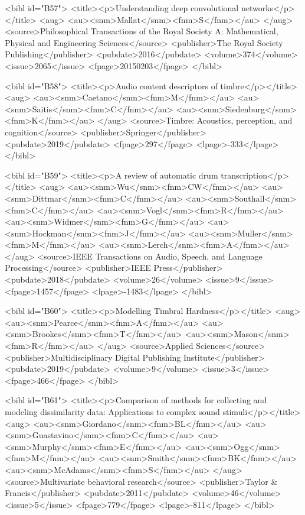 \documentclass{bmcart}
\begin{document}
\begin{backmatter}
{<bibl id="B57">
  <title><p>Understanding deep convolutional networks</p></title>
  <aug>
    <au><snm>Mallat</snm><fnm>S</fnm></au>
  </aug>
  <source>Philosophical Transactions of the Royal Society A: Mathematical,
  Physical and Engineering Sciences</source>
  <publisher>The Royal Society Publishing</publisher>
  <pubdate>2016</pubdate>
  <volume>374</volume>
  <issue>2065</issue>
  <fpage>20150203</fpage>
</bibl>

<bibl id="B58">
  <title><p>Audio content descriptors of timbre</p></title>
  <aug>
    <au><snm>Caetano</snm><fnm>M</fnm></au>
    <au><snm>Saitis</snm><fnm>C</fnm></au>
    <au><snm>Siedenburg</snm><fnm>K</fnm></au>
  </aug>
  <source>Timbre: Acoustics, perception, and cognition</source>
  <publisher>Springer</publisher>
  <pubdate>2019</pubdate>
  <fpage>297</fpage>
  <lpage>-333</lpage>
</bibl>

<bibl id="B59">
  <title><p>A review of automatic drum transcription</p></title>
  <aug>
    <au><snm>Wu</snm><fnm>CW</fnm></au>
    <au><snm>Dittmar</snm><fnm>C</fnm></au>
    <au><snm>Southall</snm><fnm>C</fnm></au>
    <au><snm>Vogl</snm><fnm>R</fnm></au>
    <au><snm>Widmer</snm><fnm>G</fnm></au>
    <au><snm>Hockman</snm><fnm>J</fnm></au>
    <au><snm>Muller</snm><fnm>M</fnm></au>
    <au><snm>Lerch</snm><fnm>A</fnm></au>
  </aug>
  <source>IEEE Transactions on Audio, Speech, and Language Processing</source>
  <publisher>IEEE Press</publisher>
  <pubdate>2018</pubdate>
  <volume>26</volume>
  <issue>9</issue>
  <fpage>1457</fpage>
  <lpage>-1483</lpage>
</bibl>

<bibl id="B60">
  <title><p>Modelling Timbral Hardness</p></title>
  <aug>
    <au><snm>Pearce</snm><fnm>A</fnm></au>
    <au><snm>Brookes</snm><fnm>T</fnm></au>
    <au><snm>Mason</snm><fnm>R</fnm></au>
  </aug>
  <source>Applied Sciences</source>
  <publisher>Multidisciplinary Digital Publishing Institute</publisher>
  <pubdate>2019</pubdate>
  <volume>9</volume>
  <issue>3</issue>
  <fpage>466</fpage>
</bibl>

<bibl id="B61">
  <title><p>Comparison of methods for collecting and modeling dissimilarity
  data: Applications to complex sound stimuli</p></title>
  <aug>
    <au><snm>Giordano</snm><fnm>BL</fnm></au>
    <au><snm>Guastavino</snm><fnm>C</fnm></au>
    <au><snm>Murphy</snm><fnm>E</fnm></au>
    <au><snm>Ogg</snm><fnm>M</fnm></au>
    <au><snm>Smith</snm><fnm>BK</fnm></au>
    <au><snm>McAdams</snm><fnm>S</fnm></au>
  </aug>
  <source>Multivariate behavioral research</source>
  <publisher>Taylor \& Francis</publisher>
  <pubdate>2011</pubdate>
  <volume>46</volume>
  <issue>5</issue>
  <fpage>779</fpage>
  <lpage>-811</lpage>
</bibl>

}
\end{backmatter}
\end{document}
